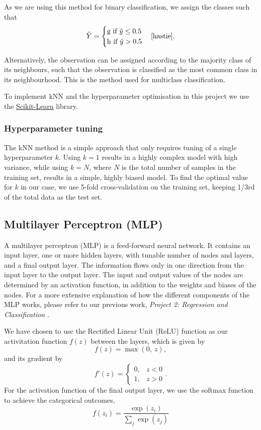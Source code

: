 \documentclass[a4paper, 11pt, twocolumn]{article}
\begin{document}
As we are using this method for binary classification, we assign the classes 
such that
\begin{equation}
\hat{Y}=
\begin{cases}
      \text{g if }  \hat{y}\leq 0.5\\
      \text{h if } \hat{y} > 0.5
\end{cases} \cite{hastie}.
\end{equation}

Alternatively, the observation can be assigned according to the majority class of
its neighbours, such that the observation is classified as the most common class
in its neighbourhood. This is the method used for multiclass classification.

To implement kNN and the hyperparameter optimisation in this project we use the
\href{https://scikit-learn.org/stable}{Scikit-Learn}
library.

\subsubsection{Hyperparameter tuning}
The kNN method is a simple approach that only requires tuning of a single
hyperparameter $k$. Using $k=1$ results in a highly complex model with high
variance, while using $k=N$, where $N$ is the total number of samples in the
training set, results in a simple, highly biased model. To find the optimal value
for $k$ in our case, we use 5-fold cross-validation on the training set, keeping
1/3rd of the total data as the test set.


\subsection{Multilayer Perceptron (MLP)}
A multilayer perceptron (MLP) is a feed-forward neural network. It contains an
input layer, one or more hidden layers, with tunable number of nodes and layers,
and a final output layer. The information flows only in one direction from the
input layer to the output layer. The input and output values of the nodes are
determined by an activation function, in addition to the weights and biases of
the nodes. For a more extensive explanation of how the different components of
the MLP works, please refer to our previous work, \textit{Project 2: Regression
and Classification} \cite{project2}.

We have chosen to use the Rectified Linear Unit (ReLU) function as our
activitation function $f(z)$ between the layers, which is given by
\begin{equation}
      f(z) = \max (0,\ z),
\end{equation}
and its gradient by
\begin{equation}
      f'(z) =
      \begin{cases}
            0, &  z<0\\
            1, &  z>0
      \end{cases}.
\end{equation}
For the activation function of the final output layer, we use the softmax
function to achieve the categorical outcomes,
\begin{equation}
      f(z_i)=\frac{\exp(z_i)}{\sum_j \exp(z_j)}
\end{equation}
\end{document}

